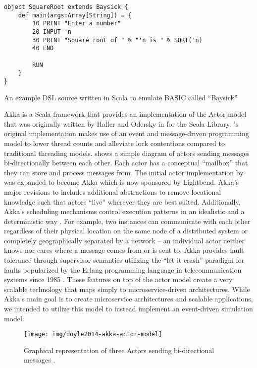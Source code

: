 \begin{listing}[b!]
\begin{verbatim}
object SquareRoot extends Baysick {
    def main(args:Array[String]) = {
        10 PRINT "Enter a number"
        20 INPUT 'n
        30 PRINT "Square root of " % "'n is " % SQRT('n)
        40 END
        
        RUN
    }
}
\end{verbatim}
\caption{An example DSL source written in Scala to emulate BASIC called ``Baysick'' \cite{FogusBaysick}}
\label{lst:scala-dsl-basic}
\end{listing}

Akka is a Scala framework that provides an implementation of the Actor model \cite{Agha1985} that was originally written by Haller and Odersky in \cite{Haller2009} for the Scala Library. \cite{Haller2009}'s original implementation makes use of an event and message-driven programming model to lower thread counts and alleviate lock contentions compared to traditional threading models.  shows a simple diagram of actors sending messages bi-directionally between each other. Each actor has a conceptual ``mailbox'' that they can store and process messages from. The initial actor implementation by \cite{Haller2009} was expanded to become Akka which is now sponsored by Lightbend. Akka's major revisions to \cite{Haller2009} includes additional abstractions to remove locational knowledge such that actors ``live'' wherever they are best suited. Additionally, Akka's scheduling mechanisms control \akkaActor{} execution patterns in an idealistic and a deterministic way \cite{TypesafeAkka2015}. For example, two \akkaActor{} instances can communicate with each other regardless of their physical location on the same node of a distributed system or completely geographically separated by a network -- an individual actor neither knows nor cares where a message comes from or is sent to. Akka provides fault tolerance through supervisor semantics utilizing the ``let-it-crash'' paradigm for faults popularized by the Erlang programming language in telecommunication systems since 1985 \cite{Armstrong2010}. These features on top of the actor model create a very scalable technology that maps simply to microservice-driven architectures. While Akka's main goal is to create microservice architectures and scalable applications, we intended to utilize this model to instead implement an event-driven simulation model.

\begin{figure}[bh!]
    \centering
    \texttt{[image: img/doyle2014-akka-actor-model]}
    \caption{Graphical representation of three Actors sending bi-directional messages \cite{DoyleAkka2014}.}
    \label{fig:doyle2014-akka-actor-model}
\end{figure} 

